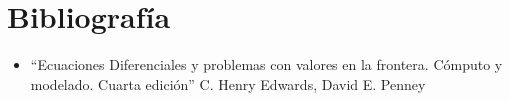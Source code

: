 \documentclass[a4paper.10pt]{article}
\begin{document}
\section{Bibliograf\'ia}
\begin{itemize}
    \item ``Ecuaciones Diferenciales y problemas con valores en la frontera. C\'omputo y modelado. Cuarta edici\'on'' C. Henry Edwards, David E. Penney
\end{itemize}
\end{document}
